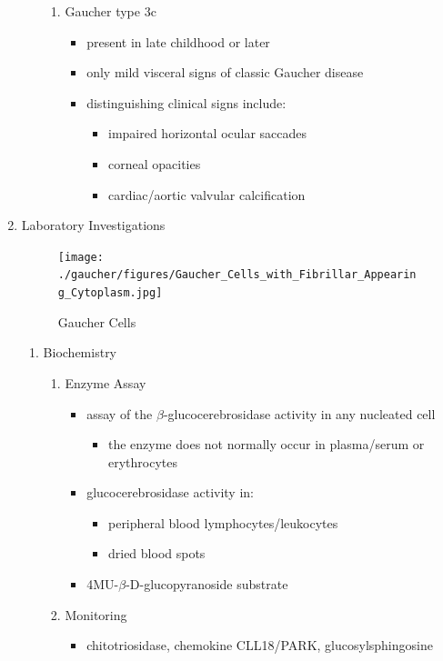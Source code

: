 \documentclass{scrartcl}
\begin{document}
\begin{enumerate}
\begin{enumerate}
\begin{enumerate}
\item Gaucher type 3c
\label{sec:org88ae709}
\begin{itemize}
\item present in late childhood or later
\item only mild visceral signs of classic Gaucher disease
\item distinguishing clinical signs include:
\begin{itemize}
\item impaired horizontal ocular saccades
\item corneal opacities
\item cardiac/aortic valvular calcification
\end{itemize}
\end{itemize}
\end{enumerate}
\end{enumerate}

\item Laboratory Investigations
\label{sec:orgfa058c5}
\begin{figure}[htbp]
\centering
\texttt{[image: ./gaucher/figures/Gaucher\_Cells\_with\_Fibrillar\_Appearing\_Cytoplasm.jpg]}
\caption{\label{fig:orga249376}
Gaucher Cells}
\end{figure}

\begin{enumerate}
\item Biochemistry
\label{sec:org4553de4}
\begin{enumerate}
\item Enzyme Assay
\label{sec:orgbdd3663}
\begin{itemize}
\item assay of the \(\beta\)-glucocerebrosidase activity in any nucleated cell
\begin{itemize}
\item the enzyme does not normally occur in plasma/serum or erythrocytes
\end{itemize}
\item glucocerebrosidase activity in:
\begin{itemize}
\item peripheral blood lymphocytes/leukocytes
\item dried blood spots
\end{itemize}
\item 4MU-\(\beta\)-D-glucopyranoside substrate
\end{itemize}

\item Monitoring
\label{sec:orgafa7647}
\begin{itemize}
\item chitotriosidase, chemokine CLL18/PARK, glucosylsphingosine
\end{itemize}
\end{enumerate}


\end{enumerate}
\end{enumerate}
\end{document}
